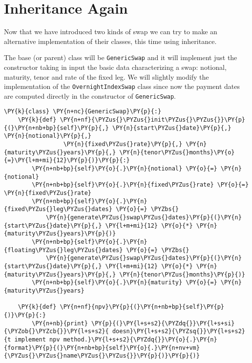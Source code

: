 \section{Inheritance Again}
Now that we have introduced two kinds of swap we can try to make an alternative implementation of their classes, this time using inheritance.

The base (or parent) class will be \texttt{GenericSwap} and it will implement just the constructor taking in input the basic data characterizing a swap: notional, maturity, tenor and rate of the fixed leg. We will slightly modify the implementation of the \texttt{OvernightIndexSwap} class since now the payment dates are computed directly in the constructor of \texttt{GenericSwap}.

\begin{codebox}[breakable, size=fbox, boxrule=1pt, pad at break*=1mm,colback=cellbackground, colframe=cellborder]
\begin{Verbatim}[commandchars=\\\{\}]
\PY{k}{class} \PY{n+nc}{GenericSwap}\PY{p}{:}
    \PY{k}{def} \PY{n+nf}{\PYZus{}\PYZus{}init\PYZus{}\PYZus{}}\PY{p}{(}\PY{n+nb+bp}{self}\PY{p}{,} \PY{n}{start\PYZus{}date}\PY{p}{,} \PY{n}{notional}\PY{p}{,} 
                 \PY{n}{fixed\PYZus{}rate}\PY{p}{,} \PY{n}{maturity\PYZus{}years}\PY{p}{,} \PY{n}{tenor\PYZus{}months}\PY{o}{=}\PY{l+m+mi}{12}\PY{p}{)}\PY{p}{:}
        \PY{n+nb+bp}{self}\PY{o}{.}\PY{n}{notional} \PY{o}{=} \PY{n}{notional}
        \PY{n+nb+bp}{self}\PY{o}{.}\PY{n}{fixed\PYZus{}rate} \PY{o}{=} \PY{n}{fixed\PYZus{}rate}
        \PY{n+nb+bp}{self}\PY{o}{.}\PY{n}{fixed\PYZus{}leg\PYZus{}dates} \PY{o}{=} \PYZbs{}
            \PY{n}{generate\PYZus{}swap\PYZus{}dates}\PY{p}{(}\PY{n}{start\PYZus{}date}\PY{p}{,} \PY{l+m+mi}{12} \PY{o}{*} \PY{n}{maturity\PYZus{}years}\PY{p}{)}
        \PY{n+nb+bp}{self}\PY{o}{.}\PY{n}{floating\PYZus{}leg\PYZus{}dates} \PY{o}{=} \PYZbs{}
            \PY{n}{generate\PYZus{}swap\PYZus{}dates}\PY{p}{(}\PY{n}{start\PYZus{}date}\PY{p}{,} \PY{l+m+mi}{12} \PY{o}{*} \PY{n}{maturity\PYZus{}years}\PY{p}{,} \PY{n}{tenor\PYZus{}months}\PY{p}{)}
        \PY{n+nb+bp}{self}\PY{o}{.}\PY{n}{maturity} \PY{o}{=} \PY{n}{maturity\PYZus{}years}
	
    \PY{k}{def} \PY{n+nf}{npv}\PY{p}{(}\PY{n+nb+bp}{self}\PY{p}{)}\PY{p}{:}
        \PY{n+nb}{print} \PY{p}{(}\PY{l+s+s2}{\PYZdq{}}\PY{l+s+si}{\PYZob{}\PYZcb{}}\PY{l+s+s2}{ doesn}\PY{l+s+s2}{\PYZsq{}}\PY{l+s+s2}{t implement npv method.}\PY{l+s+s2}{\PYZdq{}}\PY{o}{.}\PY{n}{format}\PY{p}{(}\PY{n+nb+bp}{self}\PY{o}{.}\PY{n+nv+vm}{\PYZus{}\PYZus{}name\PYZus{}\PYZus{}}\PY{p}{)}\PY{p}{)}
	

\end{Verbatim}
\end{codebox}
